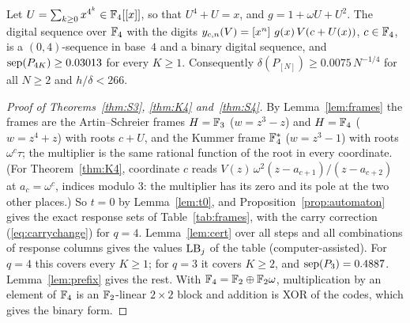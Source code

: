\begin{theorem}\label{thm:S4}
Let $U=\sum_{k\ge0}x^{4^k}\in\mathbb{F}_4[[x]]$, so that $U^4+U=x$, and $g=1+\omega U+U^2$. The digital sequence over $\mathbb{F}_4$ with the digits $y_{c,n}(V)=[x^{n}]\,\,g(x)\,V(c+U(x))$, $c\in\mathbb{F}_4$, is a $(0,4)$-sequence in base~$4$ and a binary digital sequence, and $\operatorname{sep}(P_{4K})\ge0.03013$ for every $K\ge1$. Consequently $\delta(P_{[N]})\ge0.0075\,N^{-1/4}$ for all $N\ge2$ and $h/\delta<266$.
\end{theorem}

\begin{proof}[Proof of Theorems~\ref{thm:S3}, \ref{thm:K4} and~\ref{thm:S4}]
By Lemma~\ref{lem:frames} the frames are the Artin--Schreier frames $H=\mathbb{F}_3$ ($w=z^3-z$) and $H=\mathbb{F}_4$ ($w=z^4+z$) with roots $c+U$, and the Kummer frame $\mathbb{F}_4^*$ ($w=z^3-1$) with roots $\omega^c\tau$; the multiplier is the same rational function of the root in every coordinate. (For Theorem~\ref{thm:K4}, coordinate $c$ reads $V(z)\,\omega^2(z-a_{c+1})/(z-a_{c+2})$ at $a_c=\omega^c$, indices modulo $3$: the multiplier has its zero and its pole at the two other places.) So $t=0$ by Lemma~\ref{lem:t0}, and Proposition~\ref{prop:automaton} gives the exact response sets of Table~\ref{tab:frames}, with the carry correction (\ref{eq:carrychange}) for $q=4$. Lemma~\ref{lem:cert} over all steps and all combinations of response columns gives the values $\mathrm{LB}_j$ of the table (computer-assisted). For $q=4$ this covers every $K\ge1$; for $q=3$ it covers $K\ge2$, and $\operatorname{sep}(P_3)=0.4887$. Lemma~\ref{lem:prefix} gives the rest. With $\mathbb{F}_4=\mathbb{F}_2\oplus\mathbb{F}_2\omega$, multiplication by an element of $\mathbb{F}_4$ is an $\mathbb{F}_2$-linear $2\times2$ block and addition is XOR of the codes, which gives the binary form.
\end{proof}

